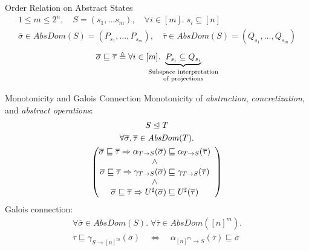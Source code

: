 \documentclass[11pt,svgnames,smaller,aspectratio=43,english]{beamer}
\makeatletter
\newcommand{\bunder}[2]{\underbrace{#1}_{\text{\scriptsize\tabular[t]{@{}c@{}}#2\endtabular}}}
\renewcommand{\implies}{\Rightarrow}
\renewcommand{\iff}{\Leftrightarrow}
\makeatother
\begin{document}
\begin{frame}{Order Relation on Abstract States}
	\begin{gather*}
		1 \leq m \leq 2^n,\quad S = (s_1, ... s_m),\quad \forall i \in [m].\; s_i \subseteq [n]\\
		\overline{\sigma} \in \mathit{AbsDom}(S) = (P_{s_1}, ..., P_{s_m}),\quad \overline{\tau} \in \mathit{AbsDom}(S) = (Q_{s_1}, ..., Q_{s_m})
	\end{gather*}
	\begin{gather*}
		\overline{\sigma} \sqsubseteq \overline{\tau} \triangleq \forall i \in [m].\; \hspace*{-1.9em}\bunder{P_{s_i} \subseteq Q_{s_i}}{Subspace interpretation\\of projections}
	\end{gather*}
\end{frame}

\begin{frame}{Monotonicity and Galois Connection}
	Monotonicity of \emph{abstraction}, \emph{concretization}, and \emph{abstract operations}:
	\vspace*{-1em}
	\begin{gather*}
		S \trianglelefteq T\\
		\forall \overline{\sigma}, \overline{\tau} \in \mathit{AbsDom}(T).\\
		\left(\begin{array}{@{}cc@{}}
			\overline{\sigma} \sqsubseteq \overline{\tau} \implies \alpha_{T\rightarrow S}(\overline{\sigma})\sqsubseteq\alpha_{T\rightarrow S}(\overline{\tau})\\
			\land\\
			\overline{\sigma} \sqsubseteq \overline{\tau} \implies \gamma_{T\rightarrow S}(\overline{\sigma})\sqsubseteq\gamma_{T\rightarrow S}(\overline{\tau})\\
			\land\\
			\overline{\sigma} \sqsubseteq \overline{\tau} \implies U^{\sharp}(\overline{\sigma})\sqsubseteq U^{\sharp}(\overline{\tau})
		\end{array}\right)
	\end{gather*}
	\pause
	Galois connection:
	\begin{gather*}
		\forall \overline{\sigma}\in \mathit{AbsDom}(S).\; \forall \overline{\tau}\in \mathit{AbsDom}([n]^m).\\
		\overline{\tau} \sqsubseteq \gamma_{S\rightarrow [n]^m}(\overline{\sigma}) \quad\iff\quad \alpha_{[n]^m \rightarrow S}(\overline{\tau}) \sqsubseteq \overline{\sigma}
	\end{gather*}
\end{frame}
\end{document}
